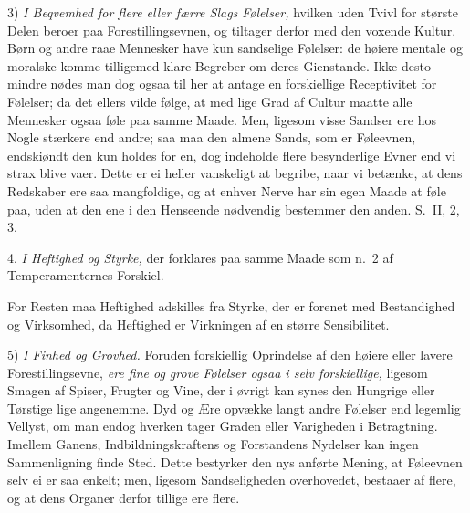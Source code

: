 \documentclass[12pt,a4paper]{article}
\newcommand{\opage}[1]{\marginnote{\footnotesize\textit{[#1]}}}
\begin{document}
3) \emph{I Beqvemhed for flere eller færre Slags Følelser,} hvilken uden Tvivl for største
Delen beroer paa Forestillingsevnen, og tiltager derfor med den voxende Kultur. Børn og
andre raae Mennesker have kun sandselige Følelser: de høiere mentale og moralske komme
tilligemed klare Begreber om deres Gienstande. Ikke desto mindre nødes man dog ogsaa til
her at antage en forskiellige Receptivitet for Følelser; da det ellers vilde følge, at med
lige Grad af Cultur maatte alle Mennesker ogsaa føle paa samme Maade. Men, ligesom visse
Sandser ere hos Nogle stærkere end andre; saa maa den almene Sands, som er Føleevnen,
endskiøndt den kun holdes for en, dog indeholde flere besynderlige Evner end vi strax
blive vaer. Dette er ei heller vanskeligt at begribe, naar vi betænke, at dens
\opage{225} Redskaber ere saa mangfoldige, og at enhver Nerve har sin egen Maade at føle paa, uden at
den ene i den Henseende nødvendig bestemmer den anden. S.~II, 2, 3.

4. \emph{I Heftighed og Styrke,} der forklares paa samme Maade som n.~2 af
Temperamenternes Forskiel.

For Resten maa Heftighed adskilles fra Styrke, der er forenet med Bestandighed og
Virksomhed, da Heftighed er Virkningen af en større Sensibilitet.

5) \emph{I Finhed og Grovhed.} Foruden forskiellig Oprindelse af den høiere eller lavere
Forestillingsevne, \emph{ere fine og grove Følelser ogsaa i selv forskiellige,} ligesom
Smagen af Spiser, Frugter og Vine, der i øvrigt kan synes den Hungrige eller Tørstige lige
angenemme. Dyd og Ære opvække langt andre Følelser end legemlig Vellyst, om man endog
hverken tager Graden eller Varigheden i Betragtning. Imellem Ganens, Indbildningskraftens
og Forstandens Nydelser kan ingen Sammenligning finde Sted. Dette bestyrker den nys
anførte Mening, at Føleevnen selv ei er saa enkelt; men, ligesom Sandseligheden
overhovedet, bestaaer af flere, og at dens Organer derfor tillige ere flere.
\end{document}
